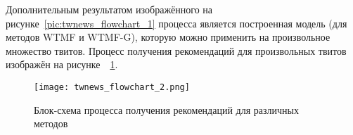     Дополнительным результатом изображённого на рисунке~\ref{pic:twnews_flowchart_1} процесса является построенная модель (для методов WTMF и WTMF-G), которую можно применить на произвольное множество твитов. Процесс получения рекомендаций для произвольных твитов изображён на рисунке~~\ref{pic:twnews_flowchart_2}.
    
    \begin{figure}[h!]
            \center
            \texttt{[image: twnews\_flowchart\_2.png]}
            \caption{Блок-схема процесса получения рекомендаций для различных методов}
            \label{pic:twnews_flowchart_2}
    \end{figure}


    



